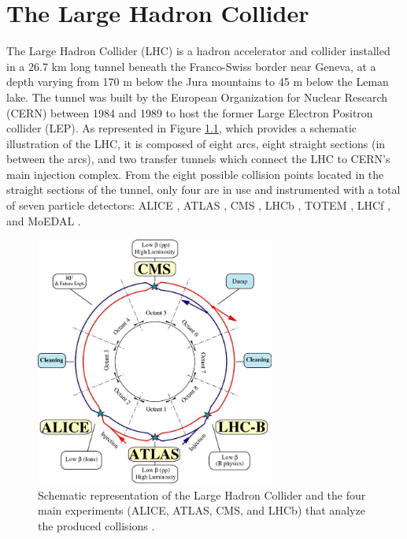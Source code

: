 \chapter{The Large Hadron Collider}
\label{chap:I-2-lhc}

	The Large Hadron Collider (LHC) \cite{Evans:2008zzb} is a hadron accelerator and collider installed in a 26.7 km long tunnel beneath the Franco-Swiss border near Geneva, at a depth varying from 170 m below the Jura mountains to 45 m below the Leman lake. The tunnel was built by the European Organization for Nuclear Research (CERN) between 1984 and 1989 to host the former Large Electron Positron collider (LEP). As represented in Figure \ref{fig:I-2-lhc-schematic}, which provides a schematic illustration of the LHC, it is composed of eight arcs, eight straight sections (in between the arcs), and two transfer tunnels which connect the LHC to CERN's main injection complex. From the eight possible collision points located in the straight sections of the tunnel, only four are in use and instrumented with a total of seven particle detectors: ALICE \cite{1748-0221-3-08-S08002}, ATLAS \cite{1748-0221-3-08-S08003}, CMS \cite{1748-0221-3-08-S08004}, LHCb \cite{1748-0221-3-08-S08005}, TOTEM \cite{1748-0221-3-08-S08007}, LHCf \cite{1748-0221-3-08-S08006}, and MoEDAL \cite{Acharya:2014nyr}. \\

	\begin{figure}[b!]
		\centering
		\includegraphics[width=0.7\textwidth]{img/I-2-lhc/lhc.jpg}
		\caption{Schematic representation of the Large Hadron Collider and the four main experiments (ALICE, ATLAS, CMS, and LHCb) that analyze the produced collisions \cite{Evans:2008zzb}.}
		\label{fig:I-2-lhc-schematic}
	\end{figure}

